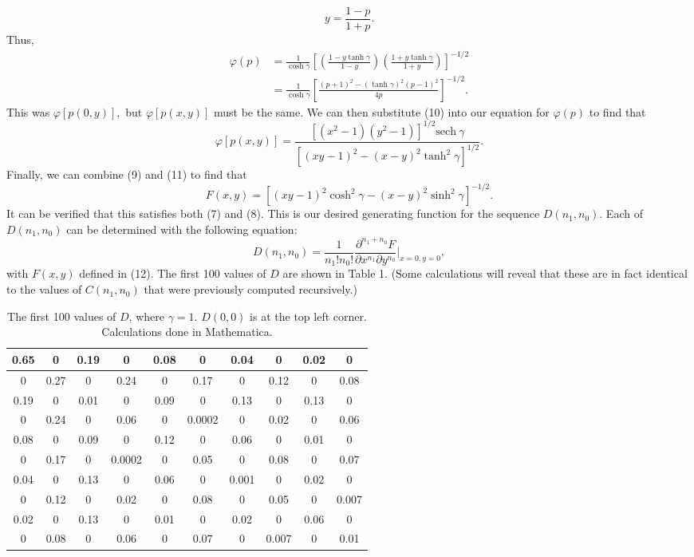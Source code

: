 \documentclass[12pt]{article}
\begin{document}
\[
y = \frac{1-p}{1+p}.
\] 
Thus,
\begin{align*}
	\varphi (p) &= \frac{1}{\cosh \gamma} \left[ \left( \frac{1 - y\tanh \gamma}{1 - y} \right) \left( \frac{1 + y\tanh \gamma}{1+ y} \right)  \right] ^{-1/2} \\
		    &= \frac{1}{\cosh \gamma} \left[ \frac{(p+1)^2 - (\tanh \gamma)^{2} (p-1)^2}{4p} \right] ^{-1/2}.
\end{align*}
This was $\varphi[p(0,y)],$ but $\varphi[p(x,y)]$ must be the same.  We can then substitute (10) into our equation for $\varphi(p)$ to find that
\begin{equation}
	\varphi[p(x,y)] = \frac{\left[ (x^2 -1)(y^2-1) \right] ^{1/2}\text{sech}\ \gamma}{\left[ (xy-1)^2 - (x-y)^2\tanh^2\gamma \right] ^{1/2}}.	
\end{equation}
Finally, we can combine (9) and (11) to find that
\begin{equation}
	F(x,y) = \left[ (xy-1)^2 \cosh^2 \gamma - (x-y)^2 \sinh^2 \gamma \right] ^{-1/2}.
\end{equation}
It can be verified that this satisfies both (7) and (8).  This is our desired generating function for the sequence $D(n_1,n_0)$.  Each of $D(n_1,n_0)$ can be determined with the following equation:
\begin{equation}
	D(n_1,n_0) = \frac{1}{n_1!n_0!} \frac{\partial^{n_1+n_0} F}{\partial x^{n_1}\partial y^{n_0}}\bigg|_{x=0,y=0},
\end{equation}
with $F(x,y)$ defined in (12). The first 100 values of $D$ are shown in Table 1.  (Some calculations will reveal that these are in fact identical to the values of $C(n_1,n_0)$ that were previously computed recursively.)
\begin{table}[ht]
\centering
\begin{tabular}{|c|c|c|c|c|c|c|c|c|c|}
\hline
0.65 & 0 & 0.19 & 0 & 0.08 & 0 & 0.04 & 0 & 0.02 & 0 \\ 
\hline
0 & 0.27 & 0 & 0.24 &    0 & 0.17 & 0 & 0.12 & 0 & 0.08 \\ 
\hline
0.19 & 0 & 0.01 & 0 & 0.09 & 0 & 0.13 & 0 &    0.13 & 0 \\ 
\hline
0 & 0.24 & 0 & 0.06 & 0 & 0.0002 & 0 & 0.02 & 0 &    0.06 \\ 
\hline
0.08 & 0 & 0.09 & 0 & 0.12 & 0 & 0.06 & 0 & 0.01 & 0 \\ 
\hline
0 & 0.17 &    0 & 0.0002 & 0 & 0.05 & 0 & 0.08 & 0 & 0.07 \\ 
\hline
0.04 & 0 & 0.13 & 0 &    0.06 & 0 & 0.001 & 0 & 0.02 & 0 \\ 
\hline
0 & 0.12 & 0 & 0.02 & 0 & 0.08 & 0 &    0.05 & 0 & 0.007 \\ 
\hline
0.02 & 0 & 0.13 & 0 & 0.01 & 0 & 0.02 & 0 & 0.06 &    0 \\ 
\hline
0 & 0.08 & 0 & 0.06 & 0 & 0.07 & 0 & 0.007 & 0 & 0.01 \\
\hline
\end{tabular}
\caption{The first 100 values of $D$, where $\gamma=1.$ $D(0,0)$ is at the top left corner. Calculations done in Mathematica.}
\end{table}
\end{document}
